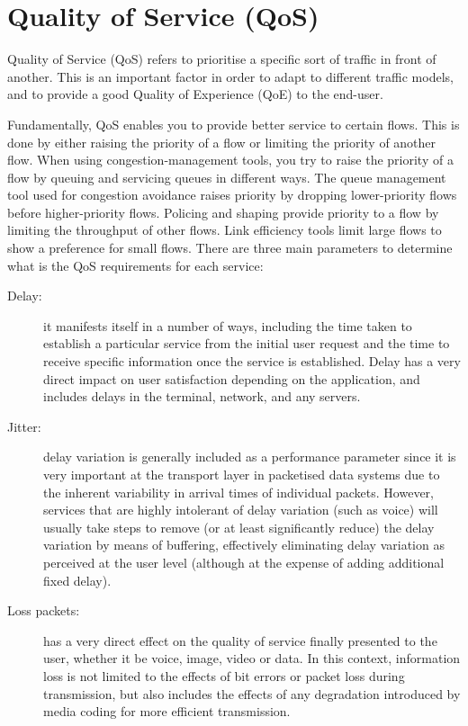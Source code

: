 
\section{Quality of Service (QoS)}
\label{sec:qos}

Quality of Service (QoS) refers to prioritise a specific sort of traffic in front of another. This is an important factor in order to adapt to different traffic models, and to provide a good Quality of Experience (QoE) to the end-user. 

Fundamentally, QoS enables you to provide better service to certain flows. This is done by either raising the priority of a flow or limiting the priority of another flow. When using congestion-management tools, you try to raise the priority of a flow by queuing and servicing queues in different ways. The queue management tool used for congestion avoidance raises priority by dropping lower-priority flows before higher-priority flows. Policing and shaping provide priority to a flow by limiting the throughput of other flows. Link efficiency tools limit large flows to show a preference for small flows. There are three main parameters to determine what is the QoS requirements for each service:

\begin{description}
\item[Delay:] it manifests itself in a number of ways, including the time taken to establish a particular service from the initial user request and the time to receive specific information once the service is established. Delay has a very direct impact on user satisfaction depending on the application, and includes delays in the terminal, network, and any servers. 
\item[Jitter:] delay variation is generally included as a performance parameter since it is very important at the transport layer in packetised data systems due to the inherent variability in arrival times of individual packets. However, services that are highly intolerant of delay variation (such as voice) will usually take steps to remove (or at least significantly reduce) the delay variation by means of buffering, effectively eliminating delay variation as perceived at the user level (although at the expense of adding additional fixed delay). 
\item[Loss packets:] has a very direct effect on the quality of service finally presented to the user, whether it be voice, image, video or data. In this context, information loss is not limited to the effects of bit errors or packet loss during transmission, but also includes the effects of any degradation introduced by media coding for more efficient transmission.
\end{description}
   

